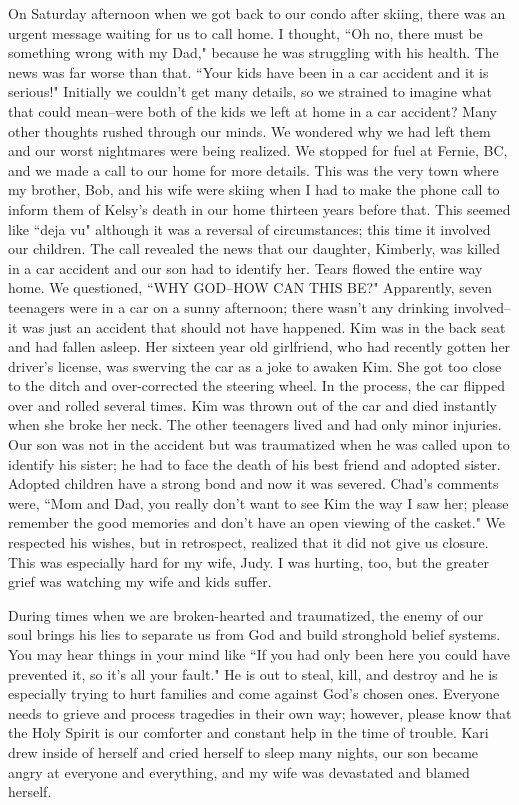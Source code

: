 \documentclass[oneside]{book}
\begin{document}
On Saturday afternoon when we got back to our condo after skiing, there was an urgent message waiting for us to call home. I thought, ``Oh no, there must be something wrong with my Dad," because he was struggling with his health. The news was far worse than that. ``Your kids have been in a car accident and it is serious!" Initially we couldn't get many details, so we strained to imagine what that could mean--were both of the kids we left at home in a car accident? Many other thoughts rushed through our minds. We wondered why we had left them and our worst nightmares were being realized. We stopped for fuel at Fernie, BC, and we made a call to our home for more details. This was the very town where my brother, Bob, and his wife were skiing when I had to make the phone call to inform them of Kelsy's death in our home thirteen years before that. This seemed like ``deja vu" although it was a reversal of circumstances; this time it involved our children. The call revealed the news that our daughter, Kimberly, was killed in a car accident and our son had to identify her. Tears flowed the entire way home. We questioned, ``WHY GOD--HOW CAN THIS BE?" Apparently, seven teenagers were in a car on a sunny afternoon; there wasn't any drinking involved--it was just an accident that should not have happened. Kim was in the back seat and had fallen asleep. Her sixteen year old girlfriend, who had recently gotten her driver's license, was swerving the car as a joke to awaken Kim. She got too close to the ditch and over-corrected the steering wheel. In the process, the car flipped over and rolled several times. Kim was thrown out of the car and died instantly when she broke her neck. The other teenagers lived and had only minor injuries. Our son was not in the accident but was traumatized when he was called upon to identify his sister; he had to face the death of his best friend and adopted sister. Adopted children have a strong bond and now it was severed. Chad's comments were, ``Mom and Dad, you really don't want to see Kim the way I saw her; please remember the good memories and don't have an open viewing of the casket." We respected his wishes, but in retrospect, realized that it did not give us closure. This was especially hard for my wife, Judy.  I was hurting, too, but the greater grief was watching my wife and kids suffer.

During times when we are broken-hearted and traumatized, the enemy of our soul brings his lies to separate us from God and build stronghold belief systems. You may hear things in your mind like ``If you had only been here you could have prevented it, so it's all your fault." He is out to steal, kill, and destroy and he is especially trying to hurt families and come against God's chosen ones. Everyone needs to grieve and process tragedies in their own way; however, please know that the Holy Spirit is our comforter and constant help in the time of trouble. Kari drew inside of herself and cried herself to sleep many nights, our son became angry at everyone and everything, and my wife was devastated and blamed herself.
\end{document}
